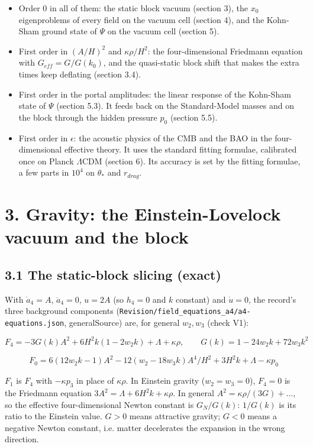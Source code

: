 \documentclass[11pt]{article}
\begin{document}
\begin{itemize}
\item Order 0 in all of them: the static block vacuum (section 3), the $x_0$ eigenproblems of every field on the vacuum cell (section 4), and the Kohn-Sham ground state of $\Psi$ on the vacuum cell (section 5).
\item First order in $(A/H)^2$ and $\kappa\rho/H^2$: the four-dimensional Friedmann equation with $G_{eff} = G/G(k_0)$, and the quasi-static block shift that makes the extra times keep deflating (section 3.4).
\item First order in the portal amplitudes: the linear response of the Kohn-Sham state of $\Psi$ (section 5.3). It feeds back on the Standard-Model masses and on the block through the hidden pressure $p_0$ (section 5.5).
\item First order in $\epsilon$: the acoustic physics of the CMB and the BAO in the four-dimensional effective theory. It uses the standard fitting formulae, calibrated once on Planck $\Lambda$CDM (section 6). Its accuracy is set by the fitting formulae, a few parts in $10^4$ on $\theta_*$ and $r_{drag}$.
\end{itemize}

\section*{3. Gravity: the Einstein-Lovelock vacuum and the block}

\subsection*{3.1 The static-block slicing (exact)}

With $\dot a_4 = A$, $\ddot a_4 = 0$, $u = 2A$ (so $h_4 = 0$ and $k$ constant) and $\dot u = 0$, the record's three background components (\texttt{Revision/\allowbreak{}field\_\allowbreak{}equations\_\allowbreak{}a4/\allowbreak{}a4-{}\allowbreak{}equations.\allowbreak{}json}, generalSource) are, for general $w_2, w_3$ (check V1):

\[F_4 = -3G(k)A^2 + 6H^2k(1 - 2w_2k) + \Lambda + \kappa\rho,\qquad G(k) = 1 - 24w_2k + 72w_3k^2\]

\[F_0 = 6(12w_2k - 1)A^2 - 12(w_2 - 18w_3k)A^4/H^2 + 3H^2k + \Lambda - \kappa p_0\]

$F_1$ is $F_4$ with $-\kappa p_3$ in place of $\kappa\rho$. In Einstein gravity ($w_2 = w_3 = 0$), $F_4 = 0$ is the Friedmann equation $3A^2 = \Lambda + 6H^2k + \kappa\rho$. In general $A^2 = \kappa\rho/(3G) + \dots$, so the effective four-dimensional Newton constant is $G_N/G(k)$: $1/G(k)$ is its ratio to the Einstein value. $G > 0$ means attractive gravity; $G < 0$ means a negative Newton constant, i.e. matter decelerates the expansion in the wrong direction.
\end{document}
